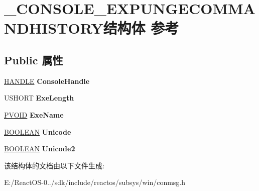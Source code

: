 \hypertarget{struct___c_o_n_s_o_l_e___e_x_p_u_n_g_e_c_o_m_m_a_n_d_h_i_s_t_o_r_y}{}\section{\+\_\+\+C\+O\+N\+S\+O\+L\+E\+\_\+\+E\+X\+P\+U\+N\+G\+E\+C\+O\+M\+M\+A\+N\+D\+H\+I\+S\+T\+O\+R\+Y结构体 参考}
\label{struct___c_o_n_s_o_l_e___e_x_p_u_n_g_e_c_o_m_m_a_n_d_h_i_s_t_o_r_y}
\subsection*{Public 属性}
\begin{DoxyCompactItemize}
\item 
\mbox{\label{struct___c_o_n_s_o_l_e___e_x_p_u_n_g_e_c_o_m_m_a_n_d_h_i_s_t_o_r_y_a8b2e344cd2499ab87740cac3ec28ca8b}} 
\hyperlink{interfacevoid}{H\+A\+N\+D\+LE} {\bfseries Console\+Handle}
\item 
\mbox{\label{struct___c_o_n_s_o_l_e___e_x_p_u_n_g_e_c_o_m_m_a_n_d_h_i_s_t_o_r_y_acd70f630b2a3156178f739f37cbe99a5}} 
U\+S\+H\+O\+RT {\bfseries Exe\+Length}
\item 
\mbox{\label{struct___c_o_n_s_o_l_e___e_x_p_u_n_g_e_c_o_m_m_a_n_d_h_i_s_t_o_r_y_a09925eef5e9add4f03eea74547ad2108}} 
\hyperlink{interfacevoid}{P\+V\+O\+ID} {\bfseries Exe\+Name}
\item 
\mbox{\label{struct___c_o_n_s_o_l_e___e_x_p_u_n_g_e_c_o_m_m_a_n_d_h_i_s_t_o_r_y_a2ed3e77b4e0c90e6bd58d0781f47d3f6}} 
\hyperlink{_processor_bind_8h_a112e3146cb38b6ee95e64d85842e380a}{B\+O\+O\+L\+E\+AN} {\bfseries Unicode}
\item 
\mbox{\label{struct___c_o_n_s_o_l_e___e_x_p_u_n_g_e_c_o_m_m_a_n_d_h_i_s_t_o_r_y_a4dfca1932f52bce00c063f4993e850b7}} 
\hyperlink{_processor_bind_8h_a112e3146cb38b6ee95e64d85842e380a}{B\+O\+O\+L\+E\+AN} {\bfseries Unicode2}
\end{DoxyCompactItemize}


该结构体的文档由以下文件生成\+:\begin{DoxyCompactItemize}
\item 
E\+:/\+React\+O\+S-\/0../sdk/include/reactos/subsys/win/conmsg.\+h\end{DoxyCompactItemize}
